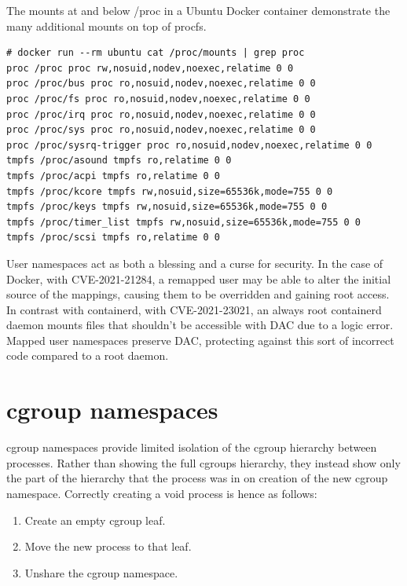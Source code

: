 \documentclass[12pt,a4paper,twoside]{report}
\begin{document}
\begin{listing}
\label{lst:docker-procfs}
\caption{The mounts at and below /proc in a Ubuntu Docker container demonstrate the many additional mounts on top of procfs.}

\begin{verbatim}
# docker run --rm ubuntu cat /proc/mounts | grep proc
proc /proc proc rw,nosuid,nodev,noexec,relatime 0 0
proc /proc/bus proc ro,nosuid,nodev,noexec,relatime 0 0
proc /proc/fs proc ro,nosuid,nodev,noexec,relatime 0 0
proc /proc/irq proc ro,nosuid,nodev,noexec,relatime 0 0
proc /proc/sys proc ro,nosuid,nodev,noexec,relatime 0 0
proc /proc/sysrq-trigger proc ro,nosuid,nodev,noexec,relatime 0 0
tmpfs /proc/asound tmpfs ro,relatime 0 0
tmpfs /proc/acpi tmpfs ro,relatime 0 0
tmpfs /proc/kcore tmpfs rw,nosuid,size=65536k,mode=755 0 0
tmpfs /proc/keys tmpfs rw,nosuid,size=65536k,mode=755 0 0
tmpfs /proc/timer_list tmpfs rw,nosuid,size=65536k,mode=755 0 0
tmpfs /proc/scsi tmpfs ro,relatime 0 0
\end{verbatim}
\end{listing}

User namespaces act as both a blessing and a curse for security. In the case of Docker, with CVE-2021-21284, a remapped user may be able to alter the initial source of the mappings, causing them to be overridden and gaining root access. In contrast with containerd, with CVE-2021-23021, an always root containerd daemon mounts files that shouldn't be accessible with DAC due to a logic error. Mapped user namespaces preserve DAC, protecting against this sort of incorrect code compared to a root daemon.

\section{cgroup namespaces}
\label{sec:voiding-cgroup}

cgroup namespaces provide limited isolation of the cgroup hierarchy between processes. Rather than showing the full cgroups hierarchy, they instead show only the part of the hierarchy that the process was in on creation of the new cgroup namespace. Correctly creating a void process is hence as follows:

\begin{enumerate}
    \item Create an empty cgroup leaf.
    \item Move the new process to that leaf.
    \item Unshare the cgroup namespace.
\end{enumerate}
\end{document}
